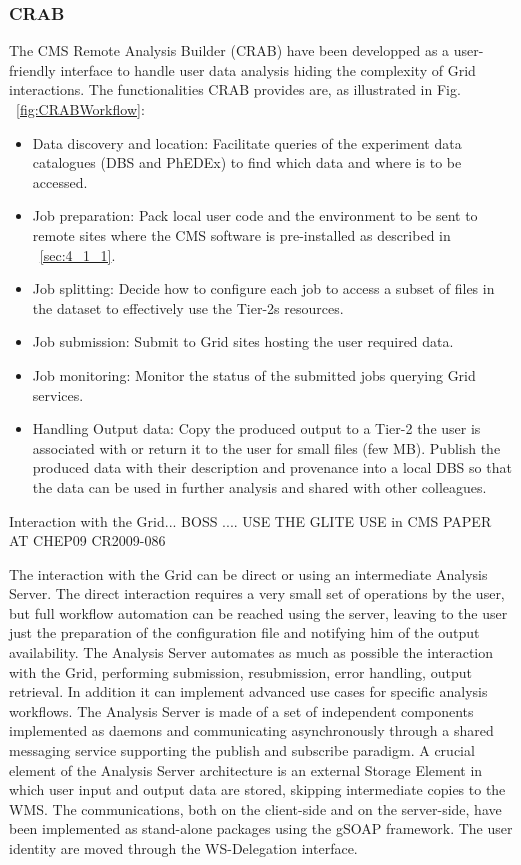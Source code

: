 \subsubsection{CRAB}
The CMS Remote Analysis Builder (CRAB) have been developped as a user-friendly interface to handle user 
data analysis hiding the complexity of Grid interactions.
The functionalities CRAB provides are, as illustrated in Fig. ~\ref{fig:CRABWorkflow}:
\begin{itemize}
\item{Data discovery and location:}
Facilitate queries of the experiment data catalogues (DBS and PhEDEx) to find which data and where is to be accessed.
\item{Job preparation:}
Pack local user code and the environment to be sent to remote sites where the CMS software is pre-installed as described in ~\ref{sec:4_1_1}.
\item{Job splitting:}
Decide how to configure each job to access a subset of files in the dataset to effectively use the Tier-2s resources.
\item{Job submission:}
Submit to Grid sites hosting the user required data.
\item{Job monitoring:}
Monitor the status of the submitted jobs querying Grid services.
\item{Handling Output data:}
Copy the produced output to a Tier-2 the user is associated with or return it to the user for small files (few MB).
Publish the produced data with their description and provenance into a local DBS so that the data can be used in further analysis and shared with other colleagues.
\end{itemize} 

Interaction with the Grid... BOSS ....
USE THE GLITE USE in CMS PAPER AT CHEP09 CR2009-086

The interaction with the Grid can be direct or using an intermediate Analysis Server. The direct
interaction requires a very small set of operations by the user, but full workflow automation can be reached using
the server, leaving to the user just the preparation of the configuration file and notifying him of the output availability. The Analysis Server automates as much as possible the interaction with the Grid, performing submission, resubmission, error handling, output retrieval. In addition it can implement advanced use cases for specific analysis workflows.
The Analysis Server is made of a set of independent components implemented as daemons and communicating asynchronously through a shared messaging service supporting the publish and subscribe paradigm.
A crucial element of the Analysis Server architecture is an external Storage Element in which user input and output
data are stored, skipping intermediate copies to the WMS.
The communications, both on the client-side and on the server-side, have been implemented as stand-alone packages
using the gSOAP framework. The user identity are moved through the WS-Delegation interface.

